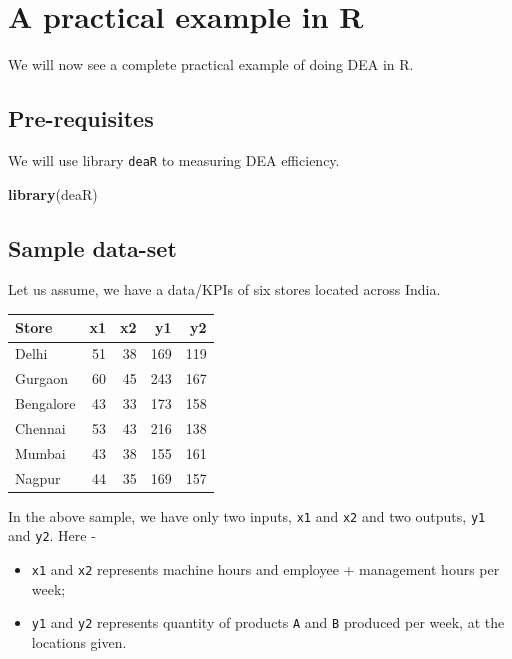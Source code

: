 \documentclass[
]{book}
\newenvironment{Shaded}{\begin{snugshade}}{\end{snugshade}}
\newcommand{\FunctionTok}[1]{\textcolor[rgb]{0.13,0.29,0.53}{\textbf{#1}}}
\newcommand{\NormalTok}[1]{#1}
\providecommand{\tightlist}{%
  \setlength{\itemsep}{0pt}\setlength{\parskip}{0pt}}
\begin{document}
\hypertarget{a-practical-example-in-r}{%
\section{A practical example in R}\label{a-practical-example-in-r}}

We will now see a complete practical example of doing DEA in R.

\hypertarget{pre-requisites-1}{%
\subsection{Pre-requisites}\label{pre-requisites-1}}

We will use library \texttt{deaR} to measuring DEA efficiency.

\begin{Shaded}
\begin{Highlighting}[]
\FunctionTok{library}\NormalTok{(deaR)}
\end{Highlighting}
\end{Shaded}

\hypertarget{sample-data-set}{%
\subsection{Sample data-set}\label{sample-data-set}}

Let us assume, we have a data/KPIs of six stores located across India.

\begin{tabular}{l|r|r|r|r}
\hline
Store & x1 & x2 & y1 & y2\\
\hline
Delhi & 51 & 38 & 169 & 119\\
\hline
Gurgaon & 60 & 45 & 243 & 167\\
\hline
Bengalore & 43 & 33 & 173 & 158\\
\hline
Chennai & 53 & 43 & 216 & 138\\
\hline
Mumbai & 43 & 38 & 155 & 161\\
\hline
Nagpur & 44 & 35 & 169 & 157\\
\hline
\end{tabular}

In the above sample, we have only two inputs, \texttt{x1} and \texttt{x2} and two outputs, \texttt{y1} and \texttt{y2}. Here -

\begin{itemize}
\tightlist
\item
  \texttt{x1} and \texttt{x2} represents machine hours and employee + management hours per week;
\item
  \texttt{y1} and \texttt{y2} represents quantity of products \texttt{A} and \texttt{B} produced per week, at the locations given.
\end{itemize}
\end{document}
